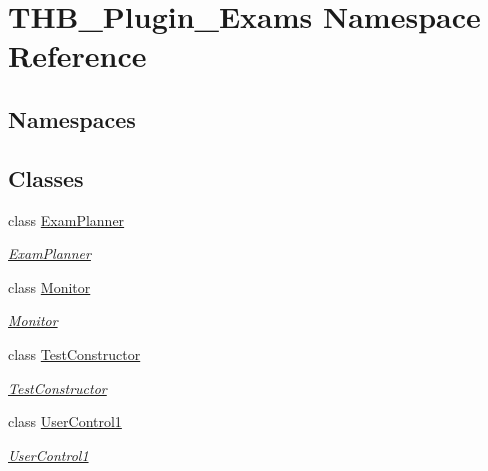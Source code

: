 \hypertarget{namespace_t_h_b___plugin___exams}{}\section{T\+H\+B\+\_\+\+Plugin\+\_\+\+Exams Namespace Reference}
\label{namespace_t_h_b___plugin___exams}
\subsection*{Namespaces}
\begin{DoxyCompactItemize}
\end{DoxyCompactItemize}
\subsection*{Classes}
\begin{DoxyCompactItemize}
\item 
class \mbox{\hyperlink{class_t_h_b___plugin___exams_1_1_exam_planner}{Exam\+Planner}}
\begin{DoxyCompactList}\small\item\em \mbox{\hyperlink{class_t_h_b___plugin___exams_1_1_exam_planner}{Exam\+Planner}} \end{DoxyCompactList}\item 
class \mbox{\hyperlink{class_t_h_b___plugin___exams_1_1_monitor}{Monitor}}
\begin{DoxyCompactList}\small\item\em \mbox{\hyperlink{class_t_h_b___plugin___exams_1_1_monitor}{Monitor}} \end{DoxyCompactList}\item 
class \mbox{\hyperlink{class_t_h_b___plugin___exams_1_1_test_constructor}{Test\+Constructor}}
\begin{DoxyCompactList}\small\item\em \mbox{\hyperlink{class_t_h_b___plugin___exams_1_1_test_constructor}{Test\+Constructor}} \end{DoxyCompactList}\item 
class \mbox{\hyperlink{class_t_h_b___plugin___exams_1_1_user_control1}{User\+Control1}}
\begin{DoxyCompactList}\small\item\em \mbox{\hyperlink{class_t_h_b___plugin___exams_1_1_user_control1}{User\+Control1}} \end{DoxyCompactList}\end{DoxyCompactItemize}
